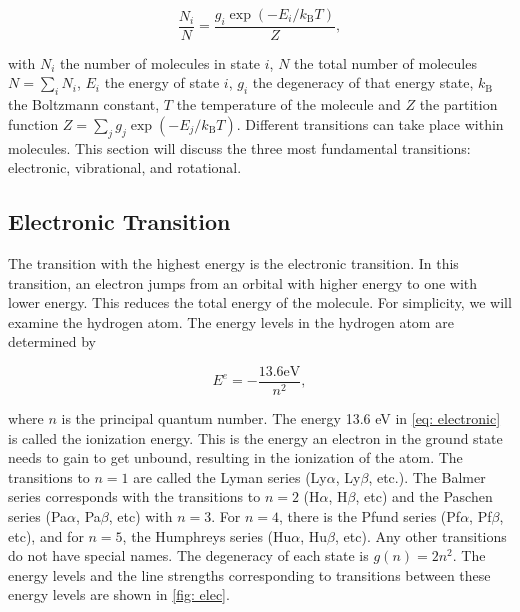 \documentclass[oneside, single, authoryear, semicolon, 12pt]{lion-msc}
\newcommand{\4}{$_4$}
\newcommand{\3}{$_3$}
\newcommand{\2}{$_2$}
\begin{document}
\begin{equation}
    \frac{N_i}{N}=\frac{g_i\exp{(-E_i/k_\mathrm{B}T)}}{Z},
    \label{eq: boltzmann}
\end{equation}

with $N_i$ the number of molecules in state $i$, $N$ the total number of molecules $N=\sum_iN_i$, $E_i$ the energy of state $i$, $g_i$ the degeneracy of that energy state, $k_\mathrm{B}$ the Boltzmann constant, $T$ the temperature of the molecule and $Z$ the partition function $Z=\sum_j g_j\exp{(-E_j/k_\mathrm{B}T)}$.
Different transitions can take place within molecules. This section will discuss the three most fundamental transitions: electronic, vibrational, and rotational.

\subsection{Electronic Transition}
The transition with the highest energy is the electronic transition. In this transition, an electron jumps from an orbital with higher energy to one with lower energy. This reduces the total energy of the molecule. For simplicity, we will examine the hydrogen atom. The energy levels in the hydrogen atom are determined by

\begin{equation}
    E^e=-\frac{13.6\mathrm{ eV}}{n^2},
    \label{eq: electronic}
\end{equation}

where $n$ is the principal quantum number. The energy 13.6 eV in \autoref{eq: electronic} is called the ionization energy. This is the energy an electron in the ground state needs to gain to get unbound, resulting in the ionization of the atom. The transitions to $n=1$ are called the Lyman series (Ly$\alpha$, Ly$\beta$, etc.). The Balmer series corresponds with the transitions to $n=2$ (H$\alpha$, H$\beta$, etc) and the Paschen series (Pa$\alpha$, Pa$\beta$, etc) with $n=3$. For $n=4$, there is the Pfund series (Pf$\alpha$, Pf$\beta$, etc), and for $n=5$, the Humphreys series (Hu$\alpha$, Hu$\beta$, etc). Any other transitions do not have special names. The degeneracy of each state is $g(n)=2n^2$. The energy levels and the line strengths corresponding to transitions between these energy levels are shown in \autoref{fig: elec}.
\end{document}

